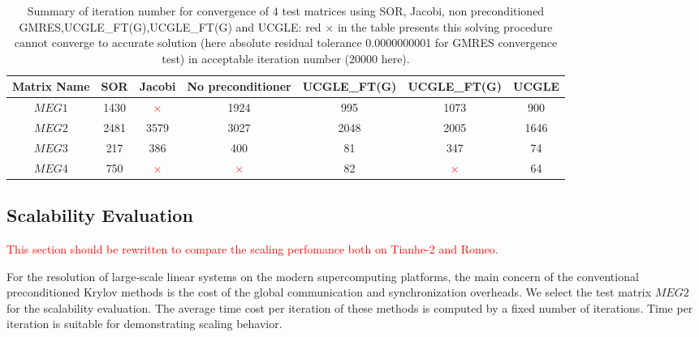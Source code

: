 \begin{table}[htbp]
	\footnotesize
	\renewcommand{\arraystretch}{1.2}
	\caption{Summary of iteration number for convergence of $4$ test matrices using SOR, Jacobi, non preconditioned GMRES,UCGLE\_FT(G),UCGLE\_FT(G) and UCGLE: red $\times$ in the table presents this solving procedure cannot converge to accurate solution (here absolute residual tolerance \num[round-precision=2,round-mode=figures]{0.0000000001} for GMRES convergence test) in acceptable iteration number ($20000$ here).}
	\label{iterations}
	\centering
	\begin{tabular}{*{7}{c}}
		\toprule
		Matrix Name& SOR & Jacobi & No preconditioner & UCGLE\_FT(G) &UCGLE\_FT(G) & UCGLE \\
		\midrule
		$MEG1$  & 1430 & \textcolor{red}{$\times$} & 1924 & 995 & 1073 & \cellcolor{yellow}900\\
		
		$MEG2$  & 2481 & 3579 & 3027 & 2048 & 2005 & \cellcolor{yellow}1646\\
		
		$MEG3$ & 217 & 386 & 400 & 81 & 347 & \cellcolor{yellow}74\\
		
		$MEG4$ & 750 & \textcolor{red}{$\times$} & \textcolor{red}{$\times$} & 82 & \textcolor{red}{$\times$} & \cellcolor{yellow}64\\
		\bottomrule
	\end{tabular}
\end{table}

\subsection{Scalability Evaluation}

\textcolor{red}{This section should be rewritten to compare the scaling perfomance both on Tianhe-2 and Romeo. }

For the resolution of large-scale linear systems on the modern supercomputing platforms, the main concern of the conventional preconditioned Krylov methods is the cost of the global communication and synchronization
overheads. We select the test matrix $MEG2$ for the scalability evaluation. The average time cost per iteration of these methods is computed by a fixed number of iterations. Time per iteration is suitable for demonstrating scaling behavior.


